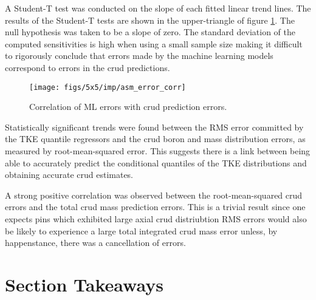 A Student-T test was conducted on the slope of each fitted linear trend lines. The results of the Student-T tests are shown in the upper-triangle of figure \ref{fig:asmerrorcorr}.  The null hypothesis was taken to be a slope of zero.  The standard deviation of the computed sensitivities is high when using a small sample size making it difficult to rigorously conclude that errors made by the machine learning models correspond to errors in the crud predictions.

\begin{figure}[H]
    \centering
    \texttt{[image: figs/5x5/imp/asm\_error\_corr]}
    \caption{Correlation of ML errors with crud prediction errors.}
    \label{fig:asmerrorcorr}
\end{figure}

Statistically significant trends were found between the RMS error committed by the TKE quantile regressors and the crud boron and mass distribution errors, as measured by root-mean-squared error.  This suggests there is a link between being able to accurately predict the conditional quantiles of the TKE distributions and obtaining accurate crud estimates.

A strong positive correlation was observed between the root-mean-squared crud errors and the total crud mass prediction errors.  This is a trivial result since one expects pins which exhibited large axial crud distriubtion RMS errors would also be likely to experience a large total integrated crud mass error unless, by happenstance, there was a cancellation of errors.


\section{Section Takeaways}


